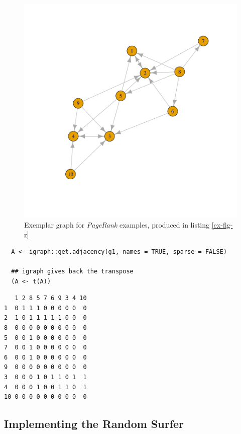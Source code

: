 \documentclass[11pt]{article}
\begin{document}
\begin{figure}[htbp]
\centering
\includegraphics[width=12cm]{media/example-graph-power-walk.png}
\caption{\label{example-rs-graph}Exemplar graph for \emph{PageRank} examples, produced in listing \ref{ex-fig-r}}
\end{figure}



\begin{listing}[htbp]
\begin{verbatim}
  A <- igraph::get.adjacency(g1, names = TRUE, sparse = FALSE)

  ## igraph gives back the transpose
  (A <- t(A))
\end{verbatim}
\caption{\label{adj-mat-random-surf}Return the Adjacency Matrix corresponding to figure \ref{example-rs-graph}}
\end{listing}

\begin{verbatim}
   1 2 8 5 7 6 9 3 4 10
1  0 1 1 1 0 0 0 0 0  0
2  1 0 1 1 1 1 1 0 0  0
8  0 0 0 0 0 0 0 0 0  0
5  0 0 1 0 0 0 0 0 0  0
7  0 0 1 0 0 0 0 0 0  0
6  0 0 1 0 0 0 0 0 0  0
9  0 0 0 0 0 0 0 0 0  0
3  0 0 0 1 0 1 1 0 1  1
4  0 0 0 1 0 0 1 1 0  1
10 0 0 0 0 0 0 0 0 0  0
\end{verbatim}


\subsection{Implementing the Random Surfer}
\label{sec:orge7b9ccb}
\end{document}
